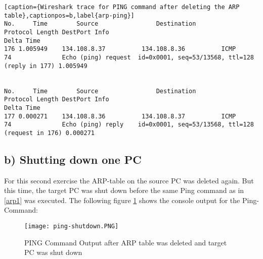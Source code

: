 \begin{lstlisting}[caption={Wireshark trace for PING command after deleting the ARP table},captionpos=b,label{arp-ping}]
No.     Time        Source                Destination           Protocol Length DestPort Info                                                            Delta Time
176 1.005949    134.108.8.37          134.108.8.36          ICMP     74              Echo (ping) request  id=0x0001, seq=53/13568, ttl=128 (reply in 177) 1.005949


No.     Time        Source                Destination           Protocol Length DestPort Info                                                            Delta Time
177 0.000271    134.108.8.36          134.108.8.37          ICMP     74              Echo (ping) reply    id=0x0001, seq=53/13568, ttl=128 (request in 176) 0.000271

\end{lstlisting}
\subsection{b) Shutting down one PC}
For this second exercise the ARP-table on the source PC was deleted again. But this time, the target PC was shut down before the same Ping command as in \ref{arp1} was executed. The following figure \ref{ping-shutdown} shows the console output for the Ping-Command:

\begin{figure}[H]
	\centering
	\texttt{[image: ping-shutdown.PNG]}
	\caption{PING Command Output after ARP table was deleted and target PC was shut down}
	\label{ping-shutdown}
\end{figure} 

